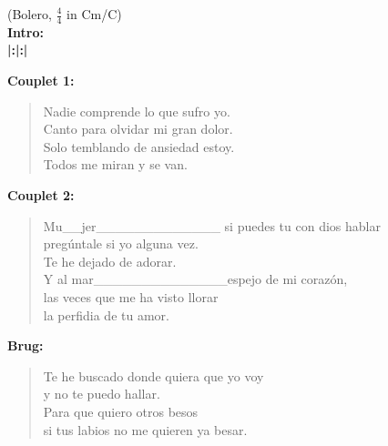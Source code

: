 (Bolero, $\frac{4}{4}$ in Cm/C)\\
\textbf{Intro:}\\
\textbf{|:\hspace{3em}\hspace{3em}|\hspace{3em}\hspace{3em}\hspace{3em}:|} 

\textbf{Couplet 1:}\\
\begin{verse}
Nadie comprende lo que sufro yo.\\
Canto para olvidar mi gran dolor.\\
Solo temblando de ansiedad estoy.\\
Todos me miran y se van. \hspace{3em}\\
\end{verse}

\textbf{Couplet 2:}\\
\begin{verse}
Mu\_{}\_{}jer\_{}\_{}\_{}\_{}\_{}\_{}\_{}\_{}\_{}\_{}\_{}\_{}\_{} si puedes tu con dios hablar \hspace{3em}\\
preg\'{u}ntale si yo alguna vez.\\
Te he dejado de adorar. \hspace{3em}\\
Y al mar\_{}\_{}\_{}\_{}\_{}\_{}\_{}\_{}\_{}\_{}\_{}\_{}\_{}\_{}espejo de mi coraz\'{o}n,\hspace{3em}\\
las veces que me ha visto llorar\\
la perfidia de tu amor.\hspace{3em}\\
\end{verse}

\textbf{Brug:}\\
\begin{verse}
Te he buscado donde quiera que yo voy\\
y no te puedo hallar.\\
Para que quiero otros besos\\
si tus labios no me quieren ya besar.\hspace{3em}\\
\end{verse}

